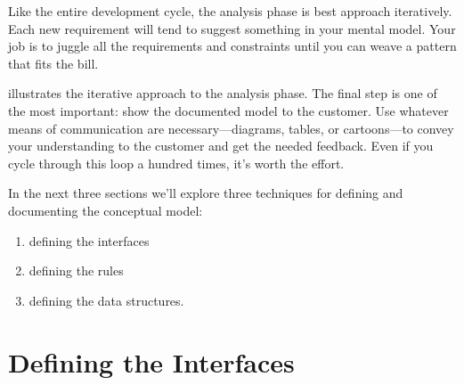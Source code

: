 Like the entire development cycle, the analysis phase is best approach
iteratively. Each new requirement will tend to suggest something in
your mental model. Your job is to juggle all the requirements and
constraints until you can weave a pattern that fits the bill.


 illustrates the iterative approach to the analysis phase.
The final step is one of the most important: show the documented model
to the customer. Use whatever means of communication are
necessary---diagrams, tables, or cartoons---to convey your
understanding to the customer and get the needed feedback. Even if you
cycle through this loop a hundred times, it's worth the effort.

In the next three sections we'll explore three techniques for defining
and documenting the conceptual model:

\begin{enumerate}
\item defining the interfaces
\item defining the rules
\item defining the data structures.
\end{enumerate}%

\section{Defining the Interfaces}%
%
%

